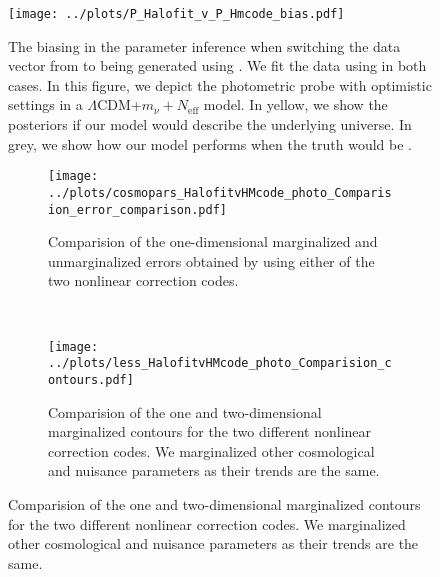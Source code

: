 \documentclass[../main.tex]{subfiles}
\begin{document}
\begin{figure}[h]
    \centering
    \caption{The biasing in the parameter inference when switching the data vector from  \hmcode to being generated using \halofit. We fit the data using \hmcode in both cases. In this figure, we depict the photometric probe with optimistic settings in a $\Lambda$CDM+$m_\nu+N_\mathrm{eff}$ model. In yellow, we show the posteriors if our model \hmcode would describe the underlying universe. In grey, we show how our model performs when the truth would be \halofit.}
    \texttt{[image: ../plots/P\_Halofit\_v\_P\_Hmcode\_bias.pdf]}
    \label{fig:triangle_HCvHM_biased}
\end{figure}
\begin{figure}
    \centering
    \caption{Same as figure \ref{fig:PcbVPmm} but switching the nonlinear model from \hmcode to \halofit.}
    \begin{subfigure}[b]{0.70\textwidth}
        \centering
        \texttt{[image: ../plots/cosmopars\_HalofitvHMcode\_photo\_Comparision\_error\_comparison.pdf]}
        \caption{Comparision of the one-dimensional marginalized and unmarginalized errors obtained by using either of the two nonlinear correction codes.}
        \label{fig:dotsHCvHM}
    \end{subfigure}
    \\
    \begin{subfigure}[b]{0.70\textwidth}
        \centering
        \texttt{[image: ../plots/less\_HalofitvHMcode\_photo\_Comparision\_contours.pdf]}
        \caption{Comparision of the one and two-dimensional marginalized contours for the two different nonlinear correction codes. We marginalized other cosmological and nuisance parameters as their trends are the same.}
        \label{fig:triangleHCvHM}
    \end{subfigure}
       \label{fig:HCvHM} 
\end{figure}
\end{document}
